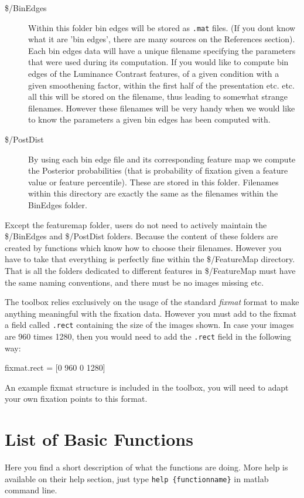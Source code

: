 \documentclass[a4paper,10pt]{report}
\begin{document}
\begin{description}
\item[\$/BinEdges] 

Within this folder bin edges will be stored as \texttt{.mat} files. (If you dont know what it are 'bin edges', there are many sources on the References section). Each bin edges data will have a unique filename specifying the parameters that were used during its computation. If you would like to compute bin edges of the Luminance Contrast features, of a given condition with a given smoothening factor, within the first half of the presentation etc. etc. all this will be stored on the filename, thus leading to somewhat strange filenames. However these filenames will be very handy when we would like to know the parameters a given bin edges has been computed with.

\item[\$/PostDist]
By using each bin edge file and its corresponding feature map we compute the Posterior probabilities (that is probability of fixation given a feature value or feature percentile). These are stored in this folder. Filenames within this directory are exactly the same as the filenames within the BinEdges folder.

\end{description}

Except the featuremap folder, users do not need to actively maintain the \$/BinEdges and \$/PostDist folders. Because the content of these folders are created by functions which know how to choose their filenames. However you have to take that everything is perfectly fine within the \$/FeatureMap directory. That is all the folders dedicated to different features in \$/FeatureMap must have the same naming conventions, and there must be no images missing etc.

The toolbox relies exclusively on the usage of the standard \textit{fixmat} format to make anything meaningful with the fixation data. However you must add to the fixmat a field called \texttt{.rect} containing the size of the images shown. In case your images are 960 times 1280, then you would need to add the \texttt{.rect} field in the following way: 

fixmat.rect = [0 960 0 1280] 

An example fixmat structure is included in the toolbox, you will need to adapt your own fixation points to this format.


\section{List of Basic Functions}
Here you find a short description of what the functions are doing. More help is available on their help section, just type \texttt{help \{functionname\}} in matlab command line.
\end{document}
